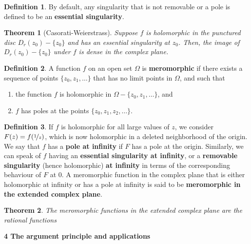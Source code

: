 \documentclass{article}
\newtheorem{theorem}{Theorem}
\theoremstyle{definition}
\newtheorem{definition}{Definition}[section]
\theoremstyle{remark}
\begin{document}
    \begin{definition}
        By default, any singularity that is not removable or a pole is defined to be an \textbf{essential singularity}.
    \end{definition}

    \begin{theorem}[Casorati-Weierstrass]
        Suppose $f$ is holomorphic in the punctured disc $D_r(z_0)-\{z_0\}$ and has an essential singularity at $z_0$. Then, the
        image of $D_r(z_0)-\{z_0\}$ under $f$ is dense in the complex plane.
    \end{theorem}

    \begin{definition}
        A function $f$ on an open set $\Omega$ is \textbf{meromorphic} if there exists a sequence of points $\{z_0,z_1,\hdots\}$ that
        has no limit points in $\Omega$, and such that
        \begin{enumerate}
            \item the function $f$ is holomorphic in $\Omega-\{z_0,z_1,\hdots\}$, and
            \item $f$ has poles at the points $\{z_0,z_1,z_2,\hdots\}$.
        \end{enumerate}
    \end{definition}

    \begin{definition}
        If $f$ is holomorphic for all large values of $z$, we consider $F(z) = f(\nicefrac{1}{z})$, which is now holomorphic in
        a deleted neighborhood of the origin. We say that $f$ has a \textbf{pole at infinity} if $F$ has a pole at the origin.
        Similarly, we can speak of $f$ having an \textbf{essential singularity at infinity}, or a \textbf{removable singularity}
        (hence holomorphic) \textbf{at infinity} in terms of the corresponding behaviour of $F$ at 0. A meromorphic function
        in the complex plane that is either holomorphic at infinity or has a pole at infinity is said to be \textbf{meromorphic
            in the extended complex plane}.
    \end{definition}

    \begin{theorem}
        The meromorphic functions in the extended complex plane are the rational functions
    \end{theorem}

    \newpage

    \textbf{4 The argument principle and applications}
\end{document}
